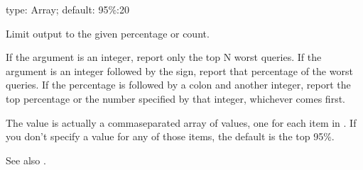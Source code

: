 \documentclass[letterpaper,10pt,english]{sphinxmanual}
\begin{document}

\begin{fulllineitems}
\label{\detokenize{mariadb-query-digest:cmdoption-mariadb-query-digest-limit}}
\sphinxAtStartPar
type: Array; default: 95\%:20

\sphinxAtStartPar
Limit output to the given percentage or count.

\sphinxAtStartPar
If the argument is an integer, report only the top N worst queries.  If the
argument is an integer followed by the \sphinxcode{\sphinxupquote{\%}} sign, report that percentage of the
worst queries.  If the percentage is followed by a colon and another integer,
report the top percentage or the number specified by that integer, whichever
comes first.

\sphinxAtStartPar
The value is actually a comma\sphinxhyphen{}separated array of values, one for each item in
{\hyperref[\detokenize{mariadb-query-digest:cmdoption-mariadb-query-digest-group-by}]{}}.  If you don’t specify a value for any of those items, the
default is the top 95\%.

\sphinxAtStartPar
See also {\hyperref[\detokenize{mariadb-query-digest:cmdoption-mariadb-query-digest-outliers}]{}}.

\end{fulllineitems}

\end{document}
